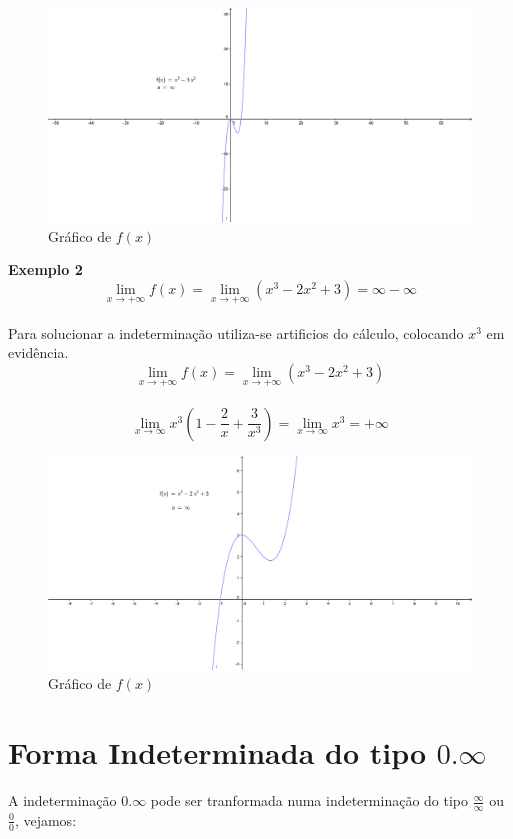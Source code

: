 \begin{figure}[H]
\centering %
\includegraphics[width=15cm]{img/graph13.png} %
\caption{Gráfico de $f(x)$}
\label{fig:graph13}
\end{figure}


\textbf{Exemplo 2} $$\displaystyle \lim_{x \to +\infty}f(x) = \lim_{x \to +\infty} (x^3-2x^2+3) = \infty - \infty$$\\
Para solucionar a indeterminação utiliza-se artificios do cálculo, colocando $x^3$ em evidência.
$$
\lim_{x \to + \infty}f(x) = \lim_{x \to + \infty} (x^3-2x^2+3)
$$\\
$$
\lim_{x \to \infty} x^3(1-\frac{2}{x}+\frac{3}{x^3}) = \lim_{x \to \infty} x^3 = + \infty
$$
\begin{figure}[H]
\centering %
\includegraphics[width=15cm]{img/graph14.png} %
\caption{Gráfico de $ f(x)$}
\label{fig:graph14}
\end{figure}

\section{Forma Indeterminada do tipo $0.\infty$}
A indeterminação $0.\infty$ pode ser tranformada numa indeterminação do tipo $\displaystyle \frac{\infty}{\infty}$ ou $\displaystyle \frac{0}{0}$, vejamos:\\

